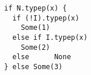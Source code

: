 \begin{lstlisting}[style=reclojureScala]
if N.typep(x) {
  if (!I).typep(x)
    Some(1)
  else if I.typep(x)
    Some(2)
  else      None
} else Some(3)
\end{lstlisting}
